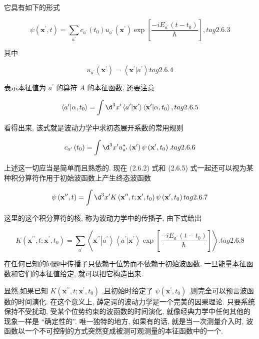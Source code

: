 \documentclass[lang=cn,newtx,10pt,scheme=chinese,thmcnt=section]{elegantbook}
\begin{document}
它具有如下的形式

$$
\psi \left( {{\mathbf{x}}^{\prime }, t}\right) = \mathop{\sum }\limits_{{a}^{\prime }}{c}_{{a}^{\prime }}\left( {t}_{0}\right) {u}_{{a}^{\prime }}\left( {\mathbf{x}}^{\prime }\right) \exp \left\lbrack \frac{-i{E}_{{a}^{\prime }}\left( {t - {t}_{0}}\right) }{\hbar }\right\rbrack , tag{2.6.3}
$$

其中

$$
{u}_{{a}^{\prime }}\left( {\mathbf{x}}^{\prime }\right) = \left\langle {{\mathbf{x}}^{\prime } | {a}^{\prime }}\right\rangle tag{2.6.4}
$$

表示本征值为 ${a}^{\prime }$ 的算符 $A$ 的本征函数. 还要注意

$$
\left\langle {{a}^{\prime } | \alpha ,{t}_{0}}\right\rangle = \int {\d}^{3}{x}^{\prime }\left\langle {{a}^{\prime } | {\mathbf{x}}^{\prime }}\right\rangle \left\langle {{\mathbf{x}}^{\prime } | \alpha ,{t}_{0}}\right\rangle , tag{2.6.5}
$$

看得出来, 该式就是波动力学中求初态展开系数的常用规则

$$
{c}_{{a}^{\prime }}\left( {t}_{0}\right) = \int {\d}^{3}{x}^{\prime }{u}_{{a}^{\prime }}^{ * }\left( {\mathbf{x}}^{\prime }\right) \psi \left( {{\mathbf{x}}^{\prime },{t}_{0}}\right) . tag{2.6.6}
$$

上述这一切应当是简单而且熟悉的. 现在 (2.6.2) 式和 (2.6.5) 式一起还可以视为某种积分算符作用于初始波函数上产生终态波函数

$$
\psi \left( {{\mathbf{x}}^{\prime \prime }, t}\right) = \int {\d}^{3}{x}^{\prime }K\left( {{\mathbf{x}}^{\prime \prime }, t;{\mathbf{x}}^{\prime },{t}_{0}}\right) \psi \left( {{\mathbf{x}}^{\prime },{t}_{0}}\right) tag{2.6.7}
$$

这里的这个积分算符的核, 称为波动力学中的传播子, 由下式给出

$$
K\left( {{\mathbf{x}}^{\prime \prime }, t;{\mathbf{x}}^{\prime },{t}_{0}}\right) = \mathop{\sum }\limits_{{a}^{\prime }}\left\langle {{\mathbf{x}}^{\prime \prime }\left| {a}^{\prime }\right\rangle \left\langle {{a}^{\prime } | {\mathbf{x}}^{\prime }}\right\rangle \exp \left\lbrack \frac{-i{E}_{{a}^{\prime }}\left( {t - {t}_{0}}\right) }{\hbar }\right\rbrack }\right\rangle . tag{2.6.8}
$$

在任何已知的问题中传播子只依赖于位势而不依赖于初始波函数. 一旦能量本征函数和它们的本征值给定, 就可以把它构造出来.

显然,如果已知 $K\left( {{\mathbf{x}}^{\prime \prime }, t;{\mathbf{x}}^{\prime },{t}_{0}}\right)$ ,且初始时给定了 $\psi \left( {{\mathbf{x}}^{\prime },{t}_{0}}\right)$ ,则完全可以预言波函数的时间演化. 在这个意义上, 薛定谔的波动力学是一个完美的因果理论. 只要系统保持不受扰动, 受某个位势约束的波函数的时间演化, 就像经典力学中任何其他的现象一样是 “确定性的”. 唯一独特的地方, 如果有的话, 就是当一次测量介入时, 波函数以一个不可控制的方式突然变成被测可观测量的本征函数中的一个.
\end{document}
